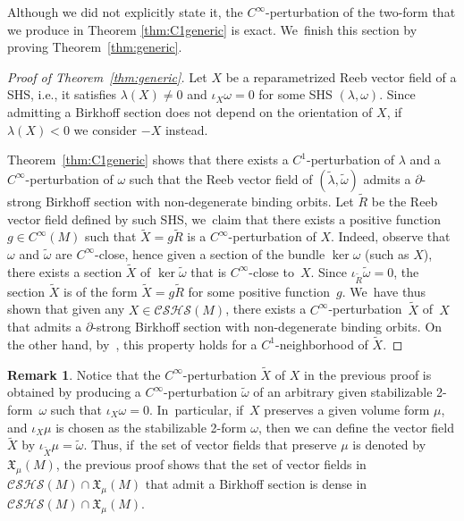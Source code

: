 \documentclass[11pt]{article}
\newcommand{\ie}{i.e.,\xspace}
\theoremstyle{definition}
\newtheorem{Remark}[theorem]{Remark}
\begin{document}
Although we did not explicitly state it, the $C^\infty$-perturbation of the two-form that we produce in Theorem \ref{thm:C1generic} is exact. We~finish this section by proving Theorem~\ref{thm:generic}.

\begin{proof}[Proof of Theorem~\ref{thm:generic}]
Let $X$ be a reparametrized Reeb vector field of a SHS, \ie it satisfies $\lambda(X)\neq 0$ and $\iota_X\omega=0$ for some SHS $(\lambda,\omega)$. Since admitting a Birkhoff section does not depend on the orientation of $X$, if~$\lambda(X)<0$ we consider $-X$ instead.

Theorem~\ref{thm:C1generic} shows that there exists a $C^1$-perturbation of $\lambda$ and a $C^\infty$-perturba\-tion of $\omega$ such that the Reeb vector field of $(\widetilde \lambda, \widetilde \omega)$ admits a $\partial$-strong Birkhoff section with non-degenerate binding orbits. Let $\widetilde R$ be the Reeb vector field defined by such SHS, we~claim that there exists a positive function $g\in C^\infty(M)$ such that $\widetilde X=g\widetilde R$ is a $C^\infty$\nobreakdash-perturbation of $X$. Indeed, observe that $\omega$ and $\widetilde \omega$ are $C^\infty$-close, hence given a section of the bundle $\ker \omega$ (such as $X$), there exists a section $\widetilde X$ of $\ker \widetilde \omega$ that is $C^\infty$-close to~$X$. Since $\iota_{\widetilde R}\widetilde \omega=0$, the section $\widetilde X$ is of the form $\widetilde X=g\widetilde R$ for some positive function~$g$. We~have thus shown that given any $X\in \mathcal{CSHS}(M)$, there exists a $C^\infty$-perturbation~$\widetilde X$ of~$X$ that admits a $\partial$-strong Birkhoff section with non-degenerate binding orbits. On the other hand, by~\cite[\S 5]{CDHR}, this property holds for a $C^1$-neighborhood of $\widetilde X$.
\end{proof}

\begin{Remark}\label{rem:fixvol}
Notice that the $C^\infty$-perturbation $\widetilde X$ of $X$ in the previous proof is obtained by producing a $C^\infty$-perturbation $\widetilde \omega$ of an arbitrary given stabilizable 2-form~$\omega$ such that $\iota_X\omega=0$. In~particular, if~$X$ preserves a given volume form $\mu$, and $\iota_X\mu$ is chosen as the stabilizable 2-form $\omega$, then we can define the vector field $\widetilde X$ by $\iota_{\widetilde X}\mu=\widetilde \omega$. Thus, if~the set of vector fields that preserve $\mu$ is denoted by $\mathfrak{X}_\mu(M)$, the previous proof shows that the set of vector fields in $\mathcal{CSHS}(M)\cap \mathfrak{X}_\mu(M)$ that admit a Birkhoff section is dense in $\mathcal{CSHS}(M)\cap \mathfrak{X}_\mu(M)$.
\end{Remark}
\end{document}
